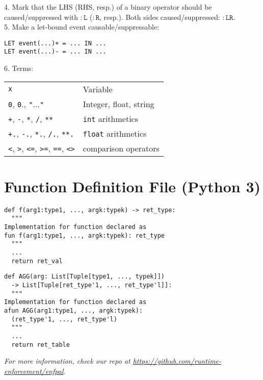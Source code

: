 \documentclass[a4paper,9pt]{extarticle}
\begin{document}
\begin{multicols}{2}
\begin{tcolorbox}
  4. Mark that the LHS (RHS, resp.) of a binary operator should be caused/suppressed
  with $\mathtt{:L}$ ($\mathtt{:R}$, resp.). Both sides caused/suppressed: $\mathtt{:LR}$.\\[5pt]
  5. Make a let-bound event causable/suppressable:
\begin{verbatim}
LET event(...)+ = ... IN ...
LET event(...)- = ... IN ...
\end{verbatim}
  6. Terms:\\
  \begin{tabular}{ll}
    \texttt{x} & Variable \\
    \texttt{0}, \texttt{0}., \texttt{"}...\texttt{"} & Integer, float, string \\
    \texttt{+}, \texttt{-}, \texttt{*}, \texttt{/}, \texttt{**} & \texttt{int} arithmetics \\
    \texttt{+.}, \texttt{-.}, \texttt{*.}, \texttt{/.}, \texttt{**.} & \texttt{float} arithmetics \\
    \texttt{<}, \texttt{>}, \texttt{<=}, \texttt{>=}, \texttt{==}, \texttt{<>}& comparison operators
  \end{tabular}
\end{tcolorbox}

\section{Function Definition File (Python 3)}
\begin{tcolorbox}
\begin{verbatim}
def f(arg1:type1, ..., argk:typek) -> ret_type:
  """
Implementation for function declared as
fun f(arg1:type1, ..., argk:typek): ret_type
  """
  ...
  return ret_val
\end{verbatim}
\begin{verbatim}
def AGG(arg: List[Tuple[type1, ..., typek]])
  -> List[Tuple[ret_type'1, ..., ret_type'l]]:
  """
Implementation for function declared as
afun AGG(arg1:type1, ..., argk:typek):
  (ret_type'1, ..., ret_type'l)
  """
  ...
  return ret_table
\end{verbatim}
\end{tcolorbox}

\end{multicols}

\vspace{0.5em}
\begin{center}
    \textit{For more information, check our repo at \url{https://github.com/runtime-enforcement/enfpal}.}
\end{center}
\end{document}
